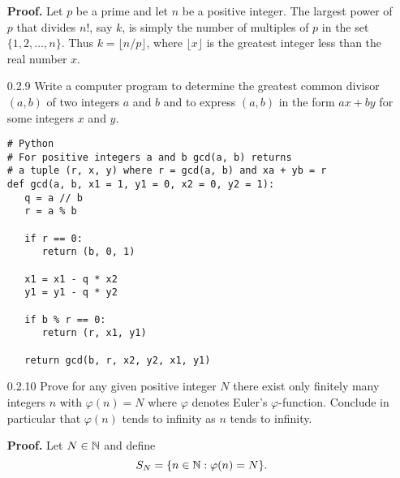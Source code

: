 \begin{enumerate}
      \textbf{Proof.} Let $p$ be a prime and let $n$ be a positive integer. The
      largest power of $p$ that divides $n!$, say $k$, is simply the number of 
      multiples of $p$ in the set $\{1, 2, \ldots, n\}$. Thus
      $k = \lfloor{n/p}\rfloor$, where $\lfloor{x}\rfloor$ is the greatest
      integer less than the real number $x$.
   \item[0.2.9]   Write a computer program to determine the greatest common
                  divisor $(a, b)$ of two integers $a$ and $b$ and to express
                  $(a, b)$ in the form $ax + by$ for some integers $x$ and $y$.

   \begin{verbatim}
# Python
# For positive integers a and b gcd(a, b) returns
# a tuple (r, x, y) where r = gcd(a, b) and xa + yb = r
def gcd(a, b, x1 = 1, y1 = 0, x2 = 0, y2 = 1):
   q = a // b
   r = a % b

   if r == 0:
      return (b, 0, 1)

   x1 = x1 - q * x2
   y1 = y1 - q * y2

   if b % r == 0:
      return (r, x1, y1)

   return gcd(b, r, x2, y2, x1, y1)
   \end{verbatim}
   \item[0.2.10]  Prove for any given positive integer $N$ there exist only
                  finitely many integers $n$ with $\varphi(n) = N$ where
                  $\varphi$ denotes Euler's $\varphi$-function. Conclude in 
                  particular that $\varphi(n)$ tends to infinity as $n$ tends to
                  infinity.

      \textbf{Proof.} Let $N \in \mathbb{N}$ and define
      $$S_N = \{n \in \mathbb{N} : \varphi(n) = N\}.$$
      

\end{enumerate}
